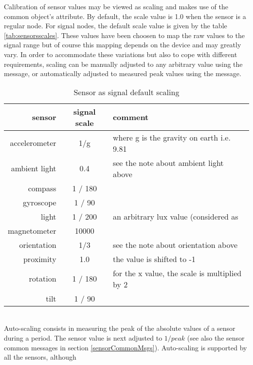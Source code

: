 \label{sensorCalibration}

Calibration of sensor values may be viewed as scaling and makes use of the common object's  attribute. By default, the scale value is 1.0 when the sensor is a regular node. For signal nodes, the default scale value is given by the table \ref{tab:sensorsscales}. These values have been choosen to map the raw values to the signal range but of course this mapping depends on the device and may greatly vary. In order to accommodate these variations but also to cope with different requirements, scaling can be manually adjusted to any arbitrary value using the  message, or automatically adjusted to measured peak values using the  message. 

\label{tab:sensorsscales}

\begin{table*}[htbp]
\begin{center}
\begin{tabular}{rcl}
\hline
sensor & signal scale 	&  comment \\
\hline
accelerometer	& 1/g 		& where g is the gravity on earth i.e. 9.81 \\
ambient light	& 0.4 		& see the note about ambient light above \\
compass			& 1 / 180 	& \\
gyroscope		& 1 / 90 	& \\
light			& 1 / 200 	& an arbitrary lux value (considered as 		\\
magnetometer	& 10000 	& \\
orientation		& 1/3 		& see the note about orientation above \\
proximity		& 1.0 		& the \OSC{false} value is shifted to -1 \\
rotation		& 1 / 180 	& for the x value, the scale is multiplied by 2 \\
tilt			& 1 / 90 	& \\
\hline
\end{tabular}
\end{center}
\caption{Sensor as signal default scaling}
\end{table*}

\\
Auto-scaling consists in measuring the peak of the absolute values of a sensor during a period. The sensor  value is next adjusted to $1 / peak$ (see also the sensor common messages in section \ref{sensorCommonMsgs}). Auto-scaling is supported by all the sensors, although 



